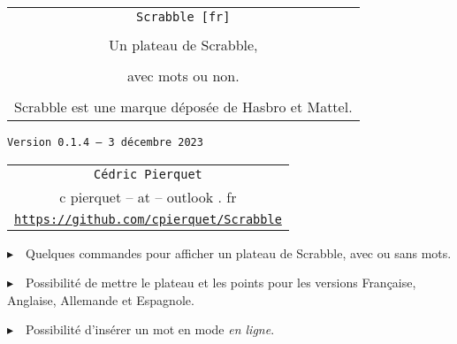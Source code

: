 \documentclass{article}
\def\TPversion{0.1.4}
\def\TPdate{3 décembre 2023}
\begin{document}
\pagestyle{fancy}

\thispagestyle{empty}

\vspace{2cm}

\begin{center}
	\begin{minipage}{0.75\linewidth}
	\begin{tcolorbox}[colframe=yellow,colback=yellow!15]
		\begin{center}
			\begin{tabular}{c}
				{\Huge \texttt{Scrabble [fr]}}\\
				\\
				{\LARGE Un plateau de Scrabble,} \\
				\\
				{\LARGE avec mots ou non.} \\
				\\
				{Scrabble\texttrademark{} est une marque déposée de Hasbro\texttrademark{} et Mattel\texttrademark{}.}
			\end{tabular}
			
			\medskip
			
			{\small \texttt{Version \TPversion{} -- \TPdate}}
		\end{center}
	\end{tcolorbox}
\end{minipage}
\end{center}

\vspace{0.5cm}

\begin{center}
	\begin{tabular}{c}
	\texttt{Cédric Pierquet}\\
	{\ttfamily c pierquet -- at -- outlook . fr}\\
	\texttt{\url{https://github.com/cpierquet/Scrabble}}
\end{tabular}
\end{center}

\vspace{0.5cm}

{$\blacktriangleright$~~Quelques commandes pour afficher un plateau de Scrabble, avec ou sans mots.}

\smallskip

{$\blacktriangleright$~~Possibilité de mettre le plateau et les points pour les versions Française, Anglaise, Allemande et Espagnole.}

\smallskip

{$\blacktriangleright$~~Possibilité d'insérer un mot en mode \textit{en ligne}.}
\end{document}
